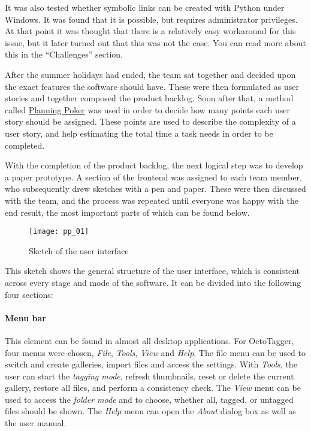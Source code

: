 It was also tested whether symbolic links can be created with Python under
Windows. It was found that it is possible, but requires administrator
privileges. At that point it was thought that there is a relatively easy
workaround for this issue, but it later turned out that this was not the case.
You can read more about this in the ``Challenges'' section. %

After the summer holidays had ended, the team sat together and decided upon the
exact features the software should have. These were then formulated as user
stories and together composed the product backlog. Soon after that, a method
called \href{https://en.wikipedia.org/wiki/Planning_poker}{Planning Poker} was
used in order to decide how many points each user story should be assigned.
These points are used to describe the complexity of a user story, and help
estimating the total time a task needs in order to be completed.

With the completion of the product backlog, the next logical step was to
develop a paper prototype. A section of the frontend was assigned to each team
member, who subsequently drew sketches with a pen and paper. These were then
discussed with the team, and the process was repeated until everyone was happy
with the end result, the most important parts of which can be found below.

\begin{figure}
	\centering
	\texttt{[image: pp\_01]}
	\caption{Sketch of the user interface}
\end{figure}

This sketch shows the general structure of the user interface, which is
consistent across every stage and mode of the software. It can be divided into
the following four sections:

\paragraph{Menu bar} This element can be found in almost all desktop
applications. For OctoTagger, four menus were chosen, \emph{File},
\emph{Tools}, \emph{View} and \emph{Help}. The file menu can be used to switch
and create galleries, import files and access the settings. With \emph{Tools}, the
user can start the \emph{tagging mode}, refresh thumbnails, reset or delete the
current gallery, restore all files, and perform a consistency check.  The \emph{View}
menu can be used to access the \emph{folder mode} and to choose, whether all,
tagged, or untagged files should be shown. The \emph{Help} menu can open the \emph{About}
dialog box as well as the user manual.

